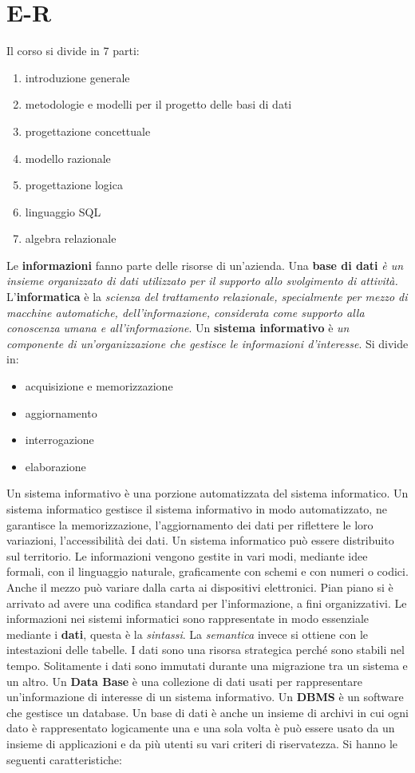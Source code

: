 \documentclass[a4paper,12pt, oneside]{book}
\begin{document}
\chapter{E-R}
Il corso si divide in 7 parti:
\begin{enumerate}
\item introduzione generale
\item metodologie e modelli per il progetto delle basi di dati
\item progettazione concettuale
\item modello razionale
\item progettazione logica
\item linguaggio SQL
\item algebra relazionale
\end{enumerate}
Le \textbf{informazioni} fanno parte delle risorse di un'azienda. Una \textbf{base di dati} \textit{è un insieme organizzato di dati utilizzato per il supporto allo svolgimento di attività.} L'\textbf{informatica} è la \textit{scienza del trattamento relazionale, specialmente per mezzo di macchine automatiche, dell'informazione, considerata come supporto alla conoscenza umana e all'informazione}. Un \textbf{sistema informativo} è \textit{un componente di un'organizzazione che gestisce le informazioni d'interesse}. Si divide in:
\begin{itemize}
\item acquisizione e memorizzazione
\item aggiornamento
\item interrogazione
\item elaborazione
\end{itemize}
Un sistema informativo è una porzione automatizzata del sistema informatico. Un sistema informatico gestisce il sistema informativo in modo automatizzato, ne garantisce la memorizzazione, l'aggiornamento dei dati per riflettere le loro variazioni, l'accessibilità dei dati. Un sistema informatico può essere distribuito sul territorio. Le informazioni vengono gestite in vari modi, mediante idee formali, con il linguaggio naturale, graficamente con schemi e con numeri o codici. Anche il mezzo può variare dalla carta ai dispositivi elettronici. Pian piano si è arrivato ad avere una codifica standard per l'informazione, a fini organizzativi. Le informazioni nei sistemi informatici sono rappresentate in modo essenziale mediante i \textbf{dati}, questa è la \textit{sintassi}. La \textit{semantica} invece si ottiene con le intestazioni delle tabelle. I dati sono una risorsa strategica perché sono stabili nel tempo. Solitamente i dati sono immutati durante una migrazione tra un sistema e un altro. Un \textbf{Data Base} è una collezione di dati usati per rappresentare un'informazione di interesse di un sistema informativo. Un \textbf{DBMS} è un software che gestisce un database. Un base di dati è anche un insieme di archivi in cui ogni dato è rappresentato logicamente una e una sola volta è può essere usato da un insieme di applicazioni e da più utenti su vari criteri di riservatezza. Si hanno le seguenti caratteristiche:
\end{document}

